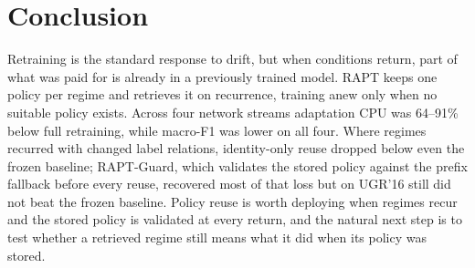 \documentclass[conference]{IEEEtran}
\begin{document}
\section{Conclusion}
Retraining is the standard response to drift, but when conditions return, part of what was
paid for is already in a previously trained model. RAPT keeps one policy per regime and
retrieves it on recurrence, training anew only when no suitable policy exists. Across four
network streams adaptation CPU was 64--91\% below full retraining, while macro-F1 was lower
on all four. Where regimes recurred with changed label relations, identity-only reuse
dropped below even the frozen baseline; RAPT-Guard, which validates the stored policy
against the prefix fallback before every reuse, recovered most of that loss but on UGR'16
still did not beat the frozen baseline. Policy reuse is worth deploying when regimes recur
and the stored policy is validated at every return, and the natural next step is to test
whether a retrieved regime still means what it did when its policy was stored.




\end{document}
